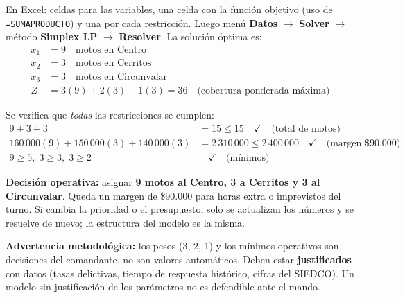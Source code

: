 \documentclass[11pt, a4paper]{article}
\begin{document}
\begin{cajaPaso}
En Excel: celdas para las variables, una celda con la funci\'on objetivo (uso de \texttt{=SUMAPRODUCTO}) y una por cada restricci\'on. Luego men\'u \textbf{Datos} $\rightarrow$ \textbf{Solver} $\rightarrow$ m\'etodo \textbf{Simplex LP} $\rightarrow$ \textbf{Resolver}. La soluci\'on \'optima es:
\begin{align*}
x_1 &= 9 \quad\text{motos en Centro}\\
x_2 &= 3 \quad\text{motos en Cerritos}\\
x_3 &= 3 \quad\text{motos en Circunvalar}\\
Z &= 3(9) + 2(3) + 1(3) = 36 \quad\text{(cobertura ponderada m\'axima)}
\end{align*}
\end{cajaPaso}

\begin{cajaPaso}
Se verifica que \textit{todas} las restricciones se cumplen:
\begin{align*}
9 + 3 + 3 &= 15 \leq 15 \quad\checkmark \quad\text{(total de motos)}\\
160\,000(9) + 150\,000(3) + 140\,000(3) &= 2\,310\,000 \leq 2\,400\,000 \quad\checkmark \quad\text{(margen \$90.000)}\\
9 \geq 5,\; 3 \geq 3,\; 3 \geq 2 &\quad\checkmark \quad\text{(m\'inimos)}
\end{align*}
\begin{cajaExito}
\textbf{Decisi\'on operativa:} asignar \textbf{9 motos al Centro, 3 a Cerritos y 3 al Circunvalar}. Queda un margen de \$90.000 para horas extra o imprevistos del turno. Si cambia la prioridad o el presupuesto, solo se actualizan los n\'umeros y se resuelve de nuevo; la estructura del modelo es la misma.
\end{cajaExito}
\end{cajaPaso}

\begin{cajaAlerta}
\textbf{Advertencia metodol\'ogica:} los pesos (3, 2, 1) y los m\'inimos operativos son decisiones del comandante, no son valores autom\'aticos. Deben estar \textbf{justificados} con datos (tasas delictivas, tiempo de respuesta hist\'orico, cifras del SIEDCO). Un modelo sin justificaci\'on de los par\'ametros no es defendible ante el mando.
\end{cajaAlerta}

\newpage
\end{document}
